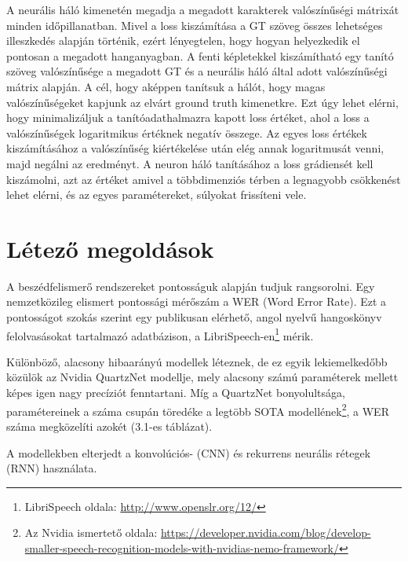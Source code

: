 A neurális háló kimenetén megadja a megadott karakterek valószínűségi mátrixát minden időpillanatban. Mivel a loss kiszámítása a GT szöveg összes lehetséges illeszkedés alapján történik, ezért lényegtelen, hogy hogyan helyezkedik el pontosan a megadott hanganyagban. A fenti képletekkel kiszámítható egy tanító szöveg valószínűsége a megadott GT és a neurális háló által adott valószínűségi mátrix alapján. A cél, hogy aképpen tanítsuk a hálót, hogy magas valószínűségeket kapjunk az elvárt ground truth kimenetkre. Ezt úgy lehet elérni, hogy minimalizáljuk a tanítóadathalmazra kapott loss értéket, ahol a loss a valószínűségek logaritmikus értéknek negatív összege. Az egyes loss értékek kiszámításához a valószínűség kiértékelése után elég annak logaritmusát venni, majd negálni az eredményt. A neuron háló tanításához a loss grádiensét kell kiszámolni, azt az értéket amivel a többdimenziós térben a legnagyobb csökkenést lehet elérni, és az egyes paramétereket, súlyokat frissíteni vele\cite{ctc}.

\section{Létező megoldások}

A beszédfelismerő rendszereket pontosságuk alapján tudjuk rangsorolni. Egy nemzetközileg elismert pontossági mérőszám a WER (Word Error Rate). Ezt a pontosságot szokás szerint egy publikusan elérhető, angol nyelvű hangoskönyv felolvasásokat tartalmazó adatbázison, a LibriSpeech-en\footnote{LibriSpeech oldala: \url{http://www.openslr.org/12/}} mérik.

Különböző, alacsony hibaarányú modellek léteznek, de ez egyik lekiemelkedőbb közülök az Nvidia QuartzNet modellje, mely alacsony számú paraméterek mellett képes igen nagy precíziót fenntartani. Míg a QuartzNet bonyolultsága, paramétereinek a száma csupán töredéke a legtöbb SOTA modellének\footnote{Az Nvidia ismertető oldala: \url{https://developer.nvidia.com/blog/develop-smaller-speech-recognition-models-with-nvidias-nemo-framework/}}, a WER száma megközelíti azokét (3.1-es táblázat).

A modellekben elterjedt a konvolúciós- (CNN) és rekurrens neurális rétegek  (RNN) használata.

